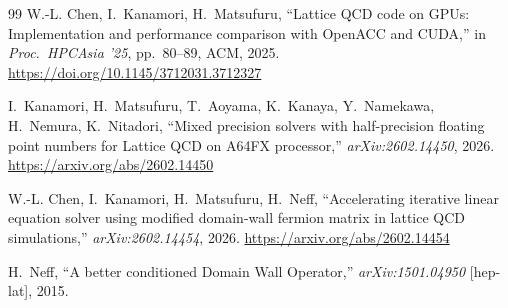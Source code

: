 \documentclass[12pt,a4paper]{article}
\begin{document}
\begin{thebibliography}{99}
W.-L. Chen, I.~Kanamori, H.~Matsufuru,
``Lattice QCD code on GPUs: Implementation and performance comparison with OpenACC and CUDA,''
in \textit{Proc.\ HPCAsia '25}, pp.~80--89, ACM, 2025.
\url{https://doi.org/10.1145/3712031.3712327}

I.~Kanamori, H.~Matsufuru, T.~Aoyama, K.~Kanaya, Y.~Namekawa, H.~Nemura, K.~Nitadori,
``Mixed precision solvers with half-precision floating point numbers for Lattice QCD on A64FX processor,''
\textit{arXiv:2602.14450}, 2026.
\url{https://arxiv.org/abs/2602.14450}

W.-L. Chen, I.~Kanamori, H.~Matsufuru, H.~Neff,
``Accelerating iterative linear equation solver using modified domain-wall fermion matrix in lattice QCD simulations,''
\textit{arXiv:2602.14454}, 2026.
\url{https://arxiv.org/abs/2602.14454}

H.~Neff,
``A better conditioned Domain Wall Operator,''
\textit{arXiv:1501.04950} [hep-lat], 2015.

\end{thebibliography}
\end{document}

